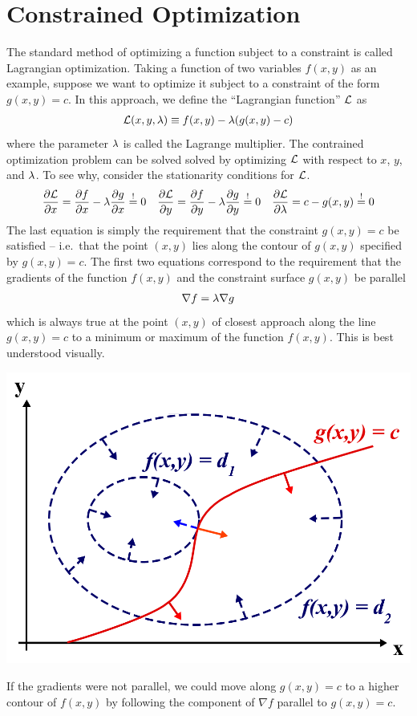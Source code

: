 \documentclass[11pt]{article}
\numberwithin{equation}{section}
\begin{document}
\section{Constrained Optimization}\label{app:constrained-optimization}
The standard method of optimizing a function subject to a constraint is called Lagrangian optimization.
Taking a function of two variables $f(x,y)$ as an example, suppose we want to optimize it subject to a constraint of the form $g(x,y)=c$.
In this approach, we define the ``Lagrangian function'' $\mathcal{L}$ as
\begin{align}
  \mathcal{L}(x,y,\lambda )
\equiv
  f(x,y)
-
  \lambda (g(x,y)-c)
\end{align}
where the parameter $\lambda $ is called the Lagrange multiplier.
The contrained optimization problem can be solved solved by optimizing $\mathcal{L}$ with respect to $x$, $y$, and $\lambda $.
To see why, consider the stationarity conditions for $\mathcal{L}$.
\begin{align}
  \frac {\partial\mathcal{L}}{\partial x}
=
  \frac {\partial f}{\partial x}
-
  \lambda \frac {\partial g}{\partial x}
\overset{!}=0
&&
  \frac {\partial\mathcal{L}}{\partial y}
=
  \frac {\partial f}{\partial y}
-
  \lambda \frac {\partial g}{\partial y}
\overset{!}=0
&&
  \frac {\partial\mathcal{L}}{\partial\lambda }
=
  c
-
  g(x,y)
\overset{!}=0
\end{align}
The last equation is simply the requirement that the constraint $g(x,y)=c$ be satisfied -- i.e.\ that the point $(x,y)$ lies along the contour of $g(x,y)$ specified by $g(x,y)=c$.
The first two equations correspond to the requirement that the gradients of the function $f(x,y)$ and the constraint surface $g(x,y)$ be parallel
\begin{align}
  \nabla f
=
  \lambda \nabla g
\end{align}
which is always true at the point $(x,y)$ of closest approach along the line $g(x,y)=c$ to a minimum or maximum of the function $f(x,y)$.
This is best understood visually.
\begin{center}
  \includegraphics[width=0.5\linewidth]{figs/lagrangian-optimization.png}
\end{center}
If the gradients were not parallel, we could move along $g(x,y)=c$ to a higher contour of $f(x,y)$ by following the component of $\nabla f$ parallel to $g(x,y)=c$.
\end{document}
